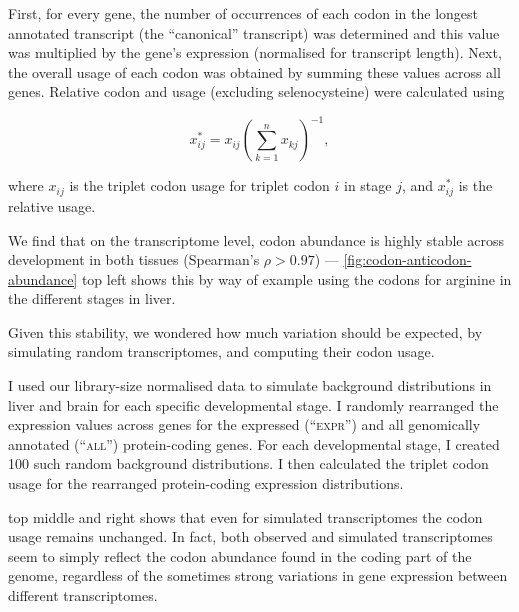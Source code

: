 First, for every gene, the number of occurrences of each codon in the longest
annotated transcript (the “canonical” transcript) was determined and this value
was multiplied by the gene’s expression (normalised for transcript length).
Next, the overall usage of each codon was obtained by summing these values
across all genes. Relative codon and usage (excluding selenocysteine) were
calculated using

\begin{equation}
    x_{ij}^* = x_{ij}\left(\sum_{k=1}^n x_{kj}\right)^{-1},
\end{equation}

where \(x_{ij}\) is the triplet codon usage for triplet codon \(i\) in stage
\(j\), and \(x_{ij}^*\) is the relative usage.

We find that on the transcriptome level, codon abundance is highly stable across
development in both tissues (Spearman’s \(\rho > 0.97\)) ---
\cref{fig:codon-anticodon-abundance} top left shows this by way of example using
the codons for arginine in the different stages in liver.

Given this stability, we wondered how much variation should be expected, by
simulating random transcriptomes, and computing their codon usage.

I used our library-size normalised \rnaseq data to simulate background
distributions in liver and brain for each specific developmental stage. I
randomly rearranged the expression values across genes for the expressed
(“\textsc{expr}”) and all genomically annotated (“\textsc{all}”) protein-coding
genes. For each developmental stage, I created \num{100} such random background
distributions. I then calculated the triplet codon usage for the rearranged
protein-coding \rna expression distributions.

 top middle and right shows that even for
simulated transcriptomes the codon usage remains unchanged. In fact, both
observed and simulated transcriptomes seem to simply reflect the codon abundance
found in the coding part of the genome, regardless of the sometimes strong
variations in gene expression between different transcriptomes.

